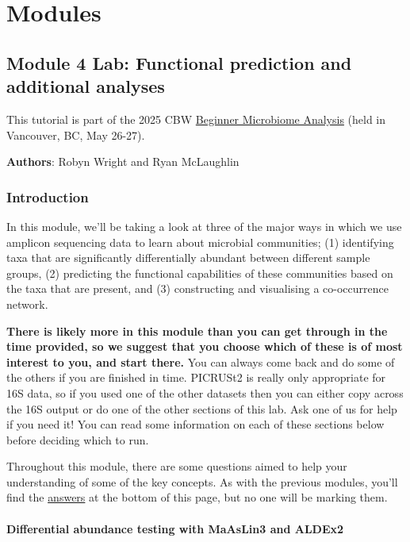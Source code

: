 \documentclass[
]{book}
\begin{document}
\part{Modules}\label{part-modules-3}

\chapter{Module 4 Lab: Functional prediction and additional analyses}\label{module-4-lab-functional-prediction-and-additional-analyses}

This tutorial is part of the 2025 CBW \href{https://bioinformaticsdotca.github.io/BMB_2025/}{Beginner Microbiome Analysis} (held in Vancouver, BC, May 26-27).

\textbf{Authors}: Robyn Wright and Ryan McLaughlin

\section{Introduction}\label{introduction-3}

In this module, we'll be taking a look at three of the major ways in which we use amplicon sequencing data to learn about microbial communities; (1) identifying taxa that are significantly differentially abundant between different sample groups, (2) predicting the functional capabilities of these communities based on the taxa that are present, and (3) constructing and visualising a co-occurrence network.

\textbf{There is likely more in this module than you can get through in the time provided, so we suggest that you choose which of these is of most interest to you, and start there.} You can always come back and do some of the others if you are finished in time. PICRUSt2 is really only appropriate for 16S data, so if you used one of the other datasets then you can either copy across the 16S output or do one of the other sections of this lab. Ask one of us for help if you need it! You can read some information on each of these sections below before deciding which to run.

Throughout this module, there are some questions aimed to help your understanding of some of the key concepts. As with the previous modules, you'll find the \hyperref[answers]{answers} at the bottom of this page, but no one will be marking them.

\subsection{Differential abundance testing with MaAsLin3 and ALDEx2}\label{differential-abundance-testing-with-maaslin3-and-aldex2}
\end{document}
